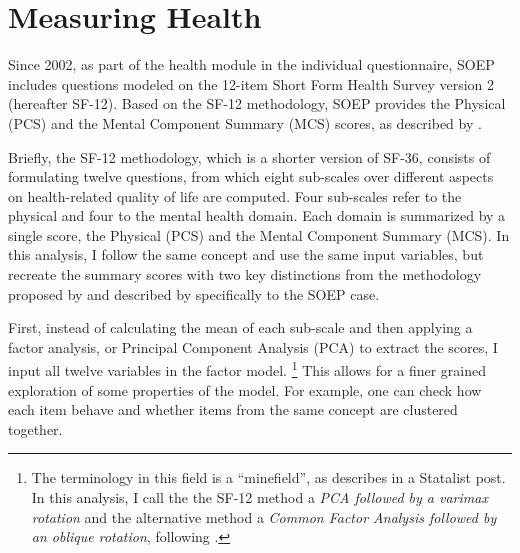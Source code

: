 
\chapter{Measuring Health}
\label{sec:meas_health}

Since 2002, as part of the health module in the individual questionnaire, SOEP includes questions modeled on
the 12-item Short Form Health Survey version 2 (hereafter SF-12). Based on the SF-12 methodology, SOEP provides
the Physical (PCS) and the Mental Component Summary (MCS) scores, as described by
\textcite[176]{andersen.etal2007computation}.


Briefly, the SF-12 methodology, which is a shorter version of SF-36, consists of formulating twelve questions, from
which eight sub-scales over different aspects on health-related quality of life are computed. Four sub-scales refer
to the physical and four to the mental health domain. Each domain is summarized by a single score, the Physical
(PCS) and the Mental Component Summary (MCS). In this analysis, I follow the same concept and use the same input
variables, but recreate the summary scores with two key distinctions from the methodology proposed by
\textcite{ware.etal2002how} and described by \textcite{andersen.etal2007computation} specifically to the SOEP case.


First, instead of calculating the mean of each sub-scale and then applying a factor analysis, or Principal
Component Analysis (PCA) to extract the scores, I input all twelve variables in the factor model.%
\footnote{The terminology in this field is a ``minefield'', as \textcite{nickcox2005st} describes in a Statalist
    post. In this analysis, I call the the SF-12 method a \textit{PCA followed by a varimax rotation} and the
    alternative method a \textit{Common Factor Analysis followed by an oblique rotation}, following
    \cite{fabrigar.wegener2012exploratory}.} %
This allows for a finer grained exploration of some properties of the model. For example, one can check how each
item behave and whether items from the same concept are clustered together.


